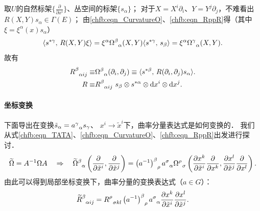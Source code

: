 取$U$的自然标架$\{\frac{\partial }{\partial x^i}\}$、丛空间的标架$\{s_\alpha\}$；
对于$X=X^i \partial_i$、$Y=Y^j \partial_j$，不难看出$R(X, Y) s_\alpha \in \Gamma(E)$；
由\eqref{chfb:eqn_CurvatureO}、\eqref{chfb:eqn_RppR}得（其中$\xi = \xi^\alpha(x) s_{\alpha}$）
\begin{align*}
	\langle s^{*\gamma},\,  R(X, Y) \xi \rangle
	=\xi^\alpha \Omega_{\hphantom{\alpha}\alpha}^\beta(X, Y) \langle s^{*\gamma},\,  s_{\beta}\rangle 
	=\xi^\alpha \Omega_{\hphantom{\alpha}\alpha}^\gamma (X, Y) .
\end{align*}
故有
\begin{subequations}\label{chfb:eqn_R-comp}
	\begin{align}
	R_{\hphantom{\alpha}\alpha i j}^\beta \equiv&
	\Omega_{\hphantom{\alpha}\alpha}^\beta (\partial_i, \partial_j) \equiv	\langle s^{*\beta},\,  
	R(\partial_i, \partial_j) s_\alpha \rangle .  \label{chfb:eqn_R-comp-1} \\
	R \equiv& R_{\hphantom{\alpha}\alpha i j}^\beta \ s_\beta \otimes 
	s^{*\alpha}\otimes {\rm d}x^i \otimes {\rm d}x^j . \label{chfb:eqn_R-comp-2}
	\end{align}
\end{subequations}

\paragraph{坐标变换} 下面导出在变换$\tilde{s}_\alpha=a_{\hphantom{\alpha}\alpha}^\gamma s_\gamma$、
$x^i\to \tilde{x}^i$下，曲率分量表达式是如何变换的．
我们从式\eqref{chfb:eqn_TATA}、\eqref{chfb:eqn_CurvatureO}、\eqref{chfb:eqn_RppR}出发进行探讨．
\begin{align*}
	\widetilde{\Omega} =A^{-1} \Omega A \quad \Rightarrow \quad 
	\widetilde{\Omega}_{\hphantom{\alpha}\alpha}^\beta
	\left( \frac{\partial }{\partial \tilde{x}^i}, \frac{\partial }{\partial \tilde{x}^j} \right) 
	=\left(a^{-1}\right)_{\hphantom{\alpha}\rho}^\beta a_{\hphantom{\alpha}\alpha}^\sigma 
	\Omega_{\hphantom{\alpha}\sigma}^\rho
	\left( \frac{\partial x^k }{\partial \tilde{x}^i} \frac{\partial }{\partial x^k}, 
	\frac{\partial x^l }{\partial \tilde{x}^j} \frac{\partial }{\partial x^l} \right) .
\end{align*}
由此可以得到局部坐标变换下，曲率分量的变换表达式（$a\in G$）：
\begin{equation}\label{chfb:eqn_Rvb-trans}
	\widetilde{R}^\beta_{\hphantom{\alpha}\alpha ij}
	= R^\rho_{\hphantom{\alpha}\sigma kl} 
	\left(a^{-1}\right)_{\hphantom{\alpha}\rho}^\beta a_{\hphantom{\alpha}\alpha}^\sigma
	\frac{\partial x^k }{\partial \tilde{x}^i} \frac{\partial x^l }{\partial \tilde{x}^j} .
\end{equation}


